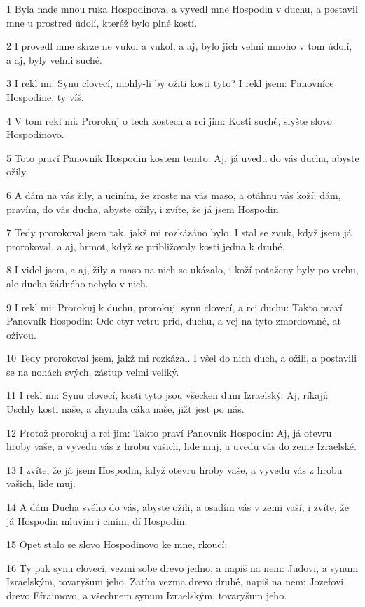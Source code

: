 \par 1 Byla nade mnou ruka Hospodinova, a vyvedl mne Hospodin v duchu, a postavil mne u prostred údolí, kteréž bylo plné kostí.
\par 2 I provedl mne skrze ne vukol a vukol, a aj, bylo jich velmi mnoho v tom údolí, a aj, byly velmi suché.
\par 3 I rekl mi: Synu clovecí, mohly-li by ožiti kosti tyto? I rekl jsem: Panovníce Hospodine, ty víš.
\par 4 V tom rekl mi: Prorokuj o tech kostech a rci jim: Kosti suché, slyšte slovo Hospodinovo.
\par 5 Toto praví Panovník Hospodin kostem temto: Aj, já uvedu do vás ducha, abyste ožily.
\par 6 A dám na vás žily, a uciním, že zroste na vás maso, a otáhnu vás koží; dám, pravím, do vás ducha, abyste ožily, i zvíte, že já jsem Hospodin.
\par 7 Tedy prorokoval jsem tak, jakž mi rozkázáno bylo. I stal se zvuk, když jsem já prorokoval, a aj, hrmot, když se približovaly kosti jedna k druhé.
\par 8 I videl jsem, a aj, žily a maso na nich se ukázalo, i koží potaženy byly po vrchu, ale ducha žádného nebylo v nich.
\par 9 I rekl mi: Prorokuj k duchu, prorokuj, synu clovecí, a rci duchu: Takto praví Panovník Hospodin: Ode ctyr vetru prid, duchu, a vej na tyto zmordované, at oživou.
\par 10 Tedy prorokoval jsem, jakž mi rozkázal. I všel do nich duch, a ožili, a postavili se na nohách svých, zástup velmi veliký.
\par 11 I rekl mi: Synu clovecí, kosti tyto jsou všecken dum Izraelský. Aj, ríkají: Uschly kosti naše, a zhynula cáka naše, jižt jest po nás.
\par 12 Protož prorokuj a rci jim: Takto praví Panovník Hospodin: Aj, já otevru hroby vaše, a vyvedu vás z hrobu vašich, lide muj, a uvedu vás do zeme Izraelské.
\par 13 I zvíte, že já jsem Hospodin, když otevru hroby vaše, a vyvedu vás z hrobu vašich, lide muj.
\par 14 A dám Ducha svého do vás, abyste ožili, a osadím vás v zemi vaší, i zvíte, že já Hospodin mluvím i ciním, dí Hospodin.
\par 15 Opet stalo se slovo Hospodinovo ke mne, rkoucí:
\par 16 Ty pak synu clovecí, vezmi sobe drevo jedno, a napiš na nem: Judovi, a synum Izraelským, tovaryšum jeho. Zatím vezma drevo druhé, napiš na nem: Jozefovi drevo Efraimovo, a všechnem synum Izraelským, tovaryšum jeho.
